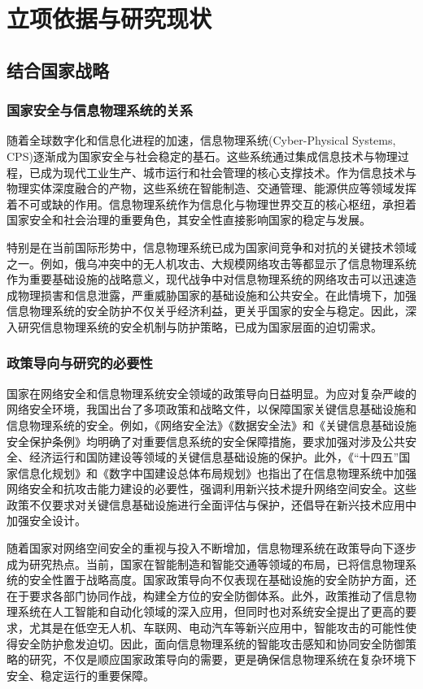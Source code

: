 \section{立项依据与研究现状}

\subsection{结合国家战略}

\subsubsection{国家安全与信息物理系统的关系}

随着全球数字化和信息化进程的加速，信息物理系统(Cyber-Physical Systems, CPS)逐渐成为国家安全与社会稳定的基石。这些系统通过集成信息技术与物理过程，已成为现代工业生产、城市运行和社会管理的核心支撑技术。作为信息技术与物理实体深度融合的产物，这些系统在智能制造、交通管理、能源供应等领域发挥着不可或缺的作用。信息物理系统作为信息化与物理世界交互的核心枢纽，承担着国家安全和社会治理的重要角色，其安全性直接影响国家的稳定与发展。

特别是在当前国际形势中，信息物理系统已成为国家间竞争和对抗的关键技术领域之一。例如，俄乌冲突中的无人机攻击、大规模网络攻击等都显示了信息物理系统作为重要基础设施的战略意义，现代战争中对信息物理系统的网络攻击可以迅速造成物理损害和信息泄露，严重威胁国家的基础设施和公共安全。在此情境下，加强信息物理系统的安全防护不仅关乎经济利益，更关乎国家的安全与稳定。因此，深入研究信息物理系统的安全机制与防护策略，已成为国家层面的迫切需求。

\subsubsection{政策导向与研究的必要性}

国家在网络安全和信息物理系统安全领域的政策导向日益明显。为应对复杂严峻的网络安全环境，我国出台了多项政策和战略文件，以保障国家关键信息基础设施和信息物理系统的安全。例如，《网络安全法》《数据安全法》和《关键信息基础设施安全保护条例》均明确了对重要信息系统的安全保障措施，要求加强对涉及公共安全、经济运行和国防建设等领域的关键信息基础设施的保护。此外，《“十四五”国家信息化规划》和《数字中国建设总体布局规划》也指出了在信息物理系统中加强网络安全和抗攻击能力建设的必要性，强调利用新兴技术提升网络空间安全。这些政策不仅要求对关键信息基础设施进行全面评估与保护，还倡导在新兴技术应用中加强安全设计。

随着国家对网络空间安全的重视与投入不断增加，信息物理系统在政策导向下逐步成为研究热点。当前，国家在智能制造和智能交通等领域的布局，已将信息物理系统的安全性置于战略高度。国家政策导向不仅表现在基础设施的安全防护方面，还在于要求各部门协同作战，构建全方位的安全防御体系。此外，政策推动了信息物理系统在人工智能和自动化领域的深入应用，但同时也对系统安全提出了更高的要求，尤其是在低空无人机、车联网、电动汽车等新兴应用中，智能攻击的可能性使得安全防护愈发迫切。因此，面向信息物理系统的智能攻击感知和协同安全防御策略的研究，不仅是顺应国家政策导向的需要，更是确保信息物理系统在复杂环境下安全、稳定运行的重要保障。

